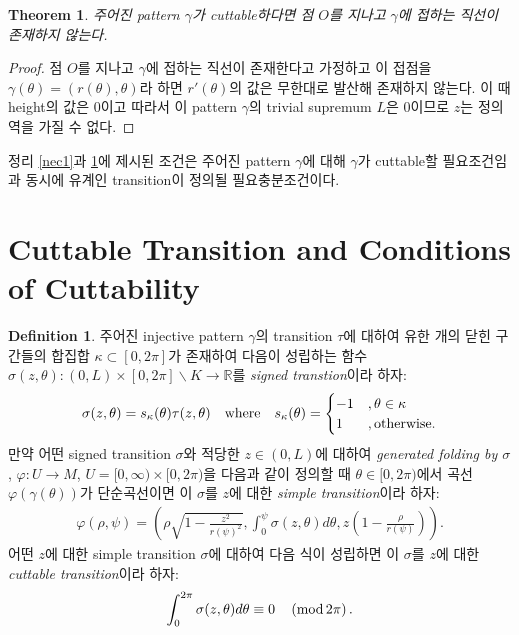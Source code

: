 \documentclass{amsart}
\theoremstyle{plain}
\newtheorem{theorem}{Theorem}[section]
\theoremstyle{definition}
\newtheorem*{definition}{Definition}
\theoremstyle{remark}
\begin{document}
\begin{theorem}\label{nec2}%
주어진 pattern $\gamma$가 cuttable하다면 점 $O$를 지나고 $\gamma$에 접하는 직선이 존재하지 않는다.
\end{theorem}

\begin{proof}
점 $O$를 지나고 $\gamma$에 접하는 직선이 존재한다고 가정하고 이 접점을 $\gamma(\theta)=(r(\theta),\theta)$라 하면 $r'(\theta)$의 값은 무한대로 발산해 존재하지 않는다.
이 때 height의 값은 $0$이고 따라서 이 pattern $\gamma$의 trivial supremum $L$은 $0$이므로 $z$는 정의역을 가질 수 없다.
\end{proof}

정리 \ref{nec1}과 \ref{nec2}에 제시된 조건은 주어진 pattern $\gamma$에 대해 $\gamma$가 cuttable할 필요조건임과 동시에 유계인 transition이 정의될 필요충분조건이다.

\bigskip










\section{Cuttable Transition and Conditions of Cuttability}

\begin{definition}
주어진 injective pattern $\gamma$의 transition $\tau$에 대하여 유한 개의 닫힌 구간들의 합집합 $\kappa\subset[0,2\pi]$가 존재하여 다음이 성립하는 함수 $\sigma(z,\theta) : (0,L)\times[0,2\pi]\backslash K\to{\mathbb R}$를 {\it signed transtion}이라 하자:
\begin{align*}
\sigma(z,\theta)=s_{\kappa}(\theta)\tau(z,\theta)\quad{\rm where}\quad s_{\kappa}(\theta)=
\begin{cases}
-1&,\theta\in\kappa\\
1&,{\rm otherwise.}
\end{cases}
\end{align*}
만약 어떤 signed transition $\sigma$와 적당한 $z\in(0,L)$에 대하여 {\it generated folding by $\sigma$}, $\varphi : U\to M$, $U=[0,\infty)\times[0,2\pi)$을 다음과 같이 정의할 때 $\theta\in[0,2\pi)$에서 곡선 $\varphi(\gamma(\theta))$가 단순곡선이면 이 $\sigma$를 $z$에 대한 {\it simple transition}이라 하자:
\begin{align}\label{gen}
\varphi(\rho,\psi)=\left(\rho\sqrt{1-\frac{z^2}{r(\psi)^2}},\int_0^{\psi} \sigma(z,\theta)d\theta,z\left(1-\frac{\rho}{r(\psi)}\right) \right).
\end{align}
어떤 $z$에 대한 simple transition $\sigma$에 대하여 다음 식이 성립하면 이 $\sigma$를 $z$에 대한 {\it cuttable transition}이라 하자:
\begin{align}
\int_0^{2\pi} \sigma(z,\theta)d\theta\equiv0\quad\left({\rm mod}\, 2\pi\right).
\end{align} 
\end{definition}
\end{document}
